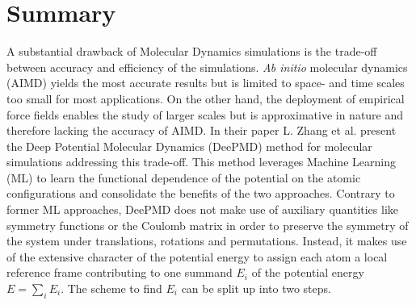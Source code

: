 \section{Summary}
A substantial drawback of Molecular Dynamics simulations is the trade-off between accuracy and efficiency of the simulations. 
\emph{Ab initio} molecular dynamics (AIMD) yields the most accurate results but is limited to space- and time scales too small for most applications. On the other hand, the deployment of empirical force fields enables the study of larger scales but is approximative in nature and therefore lacking the accuracy of AIMD. 
\newline\newline
In their paper \cite{PhysRevLett.120.143001} L. Zhang et al. present the Deep Potential Molecular Dynamics (DeePMD) method for molecular simulations addressing this trade-off. This method leverages Machine Learning (ML) to learn the functional dependence of the potential on the atomic configurations and consolidate the benefits of the two approaches. Contrary to former ML approaches, DeePMD does not make use of auxiliary quantities like symmetry functions or the Coulomb matrix in order to preserve the symmetry of the system under translations, rotations and permutations. Instead, it makes use of the extensive character of the potential energy to assign each atom a local reference frame contributing to one summand $E_i$ of the potential energy $E = \sum_i E_i$. The scheme to find $E_i$ can be split up into two steps. 
